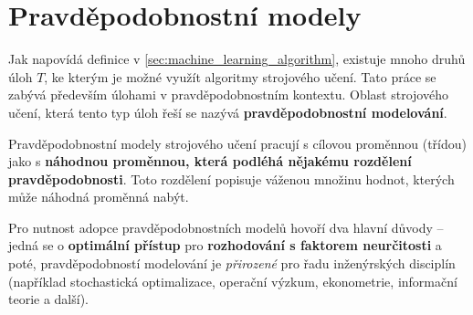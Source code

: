 \section{Pravděpodobnostní modely}
\label{sec:probabilstic_models}
Jak napovídá definice v \autoref{sec:machine_learning_algorithm}, existuje mnoho druhů úloh $T$, ke kterým je možné využít algoritmy strojového učení.
Tato práce se zabývá především úlohami v pravděpodobnostním kontextu. Oblast strojového učení, která tento typ úloh řeší se nazývá \textbf{pravděpodobnostní modelování}. 

Pravděpodobnostní modely strojového učení pracují s cílovou proměnnou (třídou) jako s \textbf{náhodnou proměnnou, která podléhá nějakému rozdělení pravděpodobnosti}.
Toto rozdělení popisuje váženou množinu hodnot, kterých může náhodná proměnná nabýt. \cite{Murphy2022}

Pro nutnost adopce pravděpodobnostních modelů hovoří dva hlavní důvody
– jedná se o \textbf{optimální přístup} pro \textbf{rozhodování s faktorem neurčitosti}
a poté, pravděpodobností modelování je \emph{přirozené} pro řadu inženýrských disciplín (například stochastická optimalizace, operační výzkum, ekonometrie, informační teorie a další). \cite{Murphy2022}


